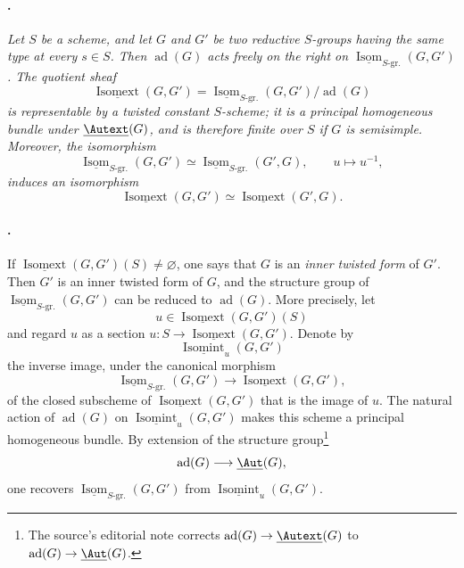 \paragraph{.}
\emph{Let \(S\) be a scheme, and let \(G\) and \(G'\) be two
reductive \(S\)-groups having the same type at every \(s\in S\).
Then \(\operatorname{ad}(G)\) acts freely on the right on
\(\underline{\operatorname{Isom}}_{S\text{-}\mathrm{gr.}}(G,G')\).
The quotient sheaf}
\[
  \underline{\operatorname{Isomext}}(G,G')
  =
  \underline{\operatorname{Isom}}_{S\text{-}\mathrm{gr.}}(G,G')
  /\operatorname{ad}(G)
\]
\emph{is representable by a twisted constant \(S\)-scheme; it is a
principal homogeneous bundle under \(\underline{\Autext}(G)\), and
is therefore finite over \(S\) if \(G\) is semisimple. Moreover, the
isomorphism}
\[
  \underline{\operatorname{Isom}}_{S\text{-}\mathrm{gr.}}(G,G')
  \simeq
  \underline{\operatorname{Isom}}_{S\text{-}\mathrm{gr.}}(G',G),
  \qquad u\longmapsto u^{-1},
\]
\emph{induces an isomorphism}
\[
  \underline{\operatorname{Isomext}}(G,G')
  \simeq
  \underline{\operatorname{Isomext}}(G',G).
\]

\paragraph{.}
If
\(\underline{\operatorname{Isomext}}(G,G')(S)\neq\varnothing\), one
says that \(G\) is an \emph{inner twisted form} of \(G'\). Then \(G'\)
is an inner twisted form of \(G\), and the structure group of
\(\underline{\operatorname{Isom}}_{S\text{-}\mathrm{gr.}}(G,G')\)
can be reduced to \(\operatorname{ad}(G)\). More precisely, let
\[
  u\in\underline{\operatorname{Isomext}}(G,G')(S)
\]
and regard \(u\) as a section
\(u:S\to\underline{\operatorname{Isomext}}(G,G')\). Denote by
\[
  \underline{\operatorname{Isomint}}_u(G,G')
\]
the inverse image, under the canonical morphism
\[
  \underline{\operatorname{Isom}}_{S\text{-}\mathrm{gr.}}(G,G')
  \longrightarrow
  \underline{\operatorname{Isomext}}(G,G'),
\]
of the closed subscheme of
\(\underline{\operatorname{Isomext}}(G,G')\) that is the image of
\(u\). The natural action of \(\operatorname{ad}(G)\) on
\(\underline{\operatorname{Isomint}}_u(G,G')\) makes this scheme a
principal homogeneous bundle. By extension of the structure
group\footnote{The source's editorial note corrects
\(\operatorname{ad}(G)\to\underline{\Autext}(G)\) to
\(\operatorname{ad}(G)\to\underline{\Aut}(G)\).}
\[
  \operatorname{ad}(G)\longrightarrow\underline{\Aut}(G),
\]
one recovers
\(\underline{\operatorname{Isom}}_{S\text{-}\mathrm{gr.}}(G,G')\)
from \(\underline{\operatorname{Isomint}}_u(G,G')\).

